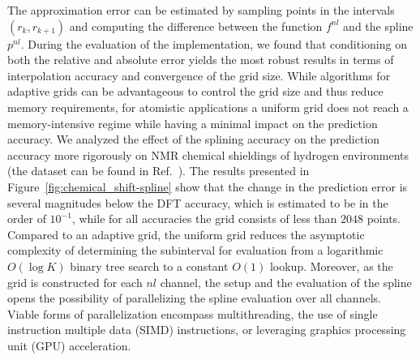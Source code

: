 The approximation error can be estimated by sampling points in the intervals $(r_k, r_{k+1})$ and computing the difference between the function $f^{nl}$ and the spline $p^{nl}$.
During the evaluation of the implementation, we found that conditioning on both the relative and absolute error yields the most robust results in terms of interpolation accuracy and convergence of the grid size.
While algorithms for adaptive grids can be advantageous to control the grid size and thus reduce memory requirements, for atomistic applications a uniform grid does not reach a memory-intensive regime while having a minimal impact on the prediction accuracy.
We analyzed the effect of the splining accuracy on the prediction accuracy more rigorously on NMR chemical shieldings of hydrogen environments (the dataset can be found in Ref.~\cite{paruzzo2018chemical}).
The results presented in Figure~\ref{fig:chemical_shift-spline} show that the change in the prediction error is several magnitudes below the DFT accuracy, which is estimated to be in the order of $10^{-1}$, while for all accuracies the grid consists of less than $2048$ points.
Compared to an adaptive grid, the uniform grid reduces the asymptotic complexity of determining the subinterval for evaluation from a logarithmic $O(\log K)$ binary tree search to a constant $O(1)$ lookup.
Moreover, as the grid is constructed for each $nl$ channel, the setup and the evaluation of the spline opens the possibility of parallelizing the spline evaluation over all channels.
Viable forms of parallelization encompass multithreading, the use of single instruction multiple data (SIMD) instructions, or leveraging graphics processing unit (GPU) acceleration.
